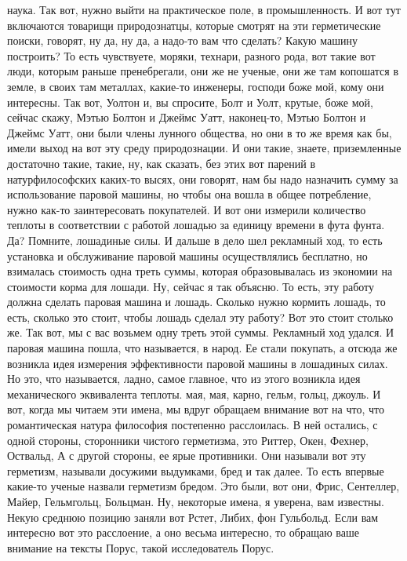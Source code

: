 наука. Так вот, нужно выйти на практическое поле, в промышленность. И вот тут
включаются товарищи природознатцы, которые смотрят на эти герметические поиски,
говорят, ну да, ну да, а надо-то вам что сделать? Какую машину построить? То
есть чувствуете, моряки, технари, разного рода, вот такие вот люди, которым
раньше пренебрегали, они же не ученые, они же там копошатся в земле, в своих там
металлах, какие-то инженеры, господи боже мой, кому они интересны. Так вот,
Уолтон и, вы спросите, Болт и Уолт, крутые, боже мой, сейчас скажу, Мэтью Болтон
и Джеймс Уатт, наконец-то, Мэтью Болтон и Джеймс Уатт, они были члены лунного
общества, но они в то же время как бы, имели выход на вот эту среду
природознации. И они такие, знаете, приземленные достаточно такие, такие, ну,
как сказать, без этих вот парений в натурфилософских каких-то высях, они
говорят, нам бы надо назначить сумму за использование паровой машины, но чтобы
она вошла в общее потребление, нужно как-то заинтересовать покупателей. И вот
они измерили количество теплоты в соответствии с работой лошадью за единицу
времени в фута фунта. Да? Помните, лошадиные силы. И дальше в дело шел рекламный
ход, то есть установка и обслуживание паровой машины осуществлялись бесплатно,
но взималась стоимость одна треть суммы, которая образовывалась из экономии на
стоимости корма для лошади. Ну, сейчас я так объясню. То есть, эту работу должна
сделать паровая машина и лошадь. Сколько нужно кормить лошадь, то есть, сколько
это стоит, чтобы лошадь сделал эту работу? Вот это стоит столько же. Так вот, мы
с вас возьмем одну треть этой суммы. Рекламный ход удался. И паровая машина
пошла, что называется, в народ. Ее стали покупать, а отсюда же возникла идея
измерения эффективности паровой машины в лошадиных силах. Но это, что
называется, ладно, самое главное, что из этого возникла идея механического
эквивалента теплоты. мая, мая, карно, гельм, гольц, джоуль. И вот, когда мы
читаем эти имена, мы вдруг обращаем внимание вот на что, что романтическая
натура философия постепенно расслоилась. В ней остались, с одной стороны,
сторонники чистого герметизма, это Риттер, Окен, Фехнер, Оствальд, А с другой
стороны, ее ярые противники. Они называли вот эту герметизм, называли досужими
выдумками, бред и так далее. То есть впервые какие-то ученые назвали герметизм
бредом. Это были, вот они, Фрис, Сентеллер, Майер, Гельмгольц, Больцман. Ну,
некоторые имена, я уверена, вам известны. Некую среднюю позицию заняли вот
Рстет, Либих, фон Гульбольд. Если вам интересно вот это расслоение, а оно весьма
интересно, то обращаю ваше внимание на тексты Порус, такой исследователь Порус.
